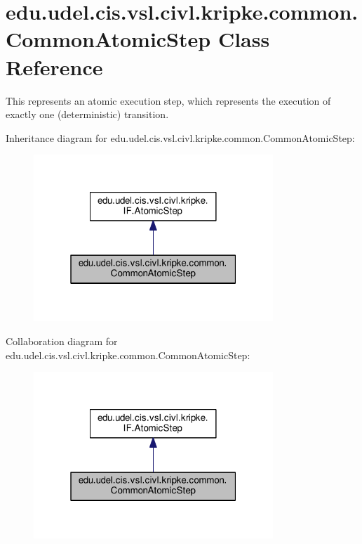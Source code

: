 \hypertarget{classedu_1_1udel_1_1cis_1_1vsl_1_1civl_1_1kripke_1_1common_1_1CommonAtomicStep}{}\section{edu.\+udel.\+cis.\+vsl.\+civl.\+kripke.\+common.\+Common\+Atomic\+Step Class Reference}
\label{classedu_1_1udel_1_1cis_1_1vsl_1_1civl_1_1kripke_1_1common_1_1CommonAtomicStep}


This represents an atomic execution step, which represents the execution of exactly one (deterministic) transition.  




Inheritance diagram for edu.\+udel.\+cis.\+vsl.\+civl.\+kripke.\+common.\+Common\+Atomic\+Step\+:
\nopagebreak
\begin{figure}[H]
\begin{center}
\leavevmode
\includegraphics[width=256pt]{classedu_1_1udel_1_1cis_1_1vsl_1_1civl_1_1kripke_1_1common_1_1CommonAtomicStep__inherit__graph}
\end{center}
\end{figure}


Collaboration diagram for edu.\+udel.\+cis.\+vsl.\+civl.\+kripke.\+common.\+Common\+Atomic\+Step\+:
\nopagebreak
\begin{figure}[H]
\begin{center}
\leavevmode
\includegraphics[width=256pt]{classedu_1_1udel_1_1cis_1_1vsl_1_1civl_1_1kripke_1_1common_1_1CommonAtomicStep__coll__graph}
\end{center}
\end{figure}
